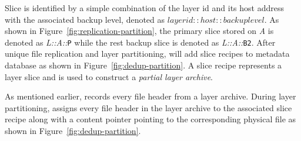 
%

Slice is identified by a simple combination of the layer id and its host address 
with the associated backup level,
denoted as $layerid::host::backuplevel$. %
As shown in Figure~\ref{fig:replication-partition},
the primary slice stored on \emph{A} is denoted as \emph{L::}\emph{A::}\texttt{P}
while the rest backup slice is denoted as \emph{L::}\emph{A::}\texttt{B2}.
After unique file replication and layer partitioning, 
\sysname will add slice recipes 
to metadata database as shown in Figure~\ref{fig:dedup-partition}.
A slice recipe represents a layer slice and
is used to construct a \emph{partial layer archive}.

As mentioned earlier, 
\sysname records every file header from a layer archive.
During layer partitioning,
\sysname
assigns every file header in the layer archive to
the associated slice recipe 
along with a content pointer pointing to the corresponding physical file as shown in Figure~\ref{fig:dedup-partition}. 
%
%



